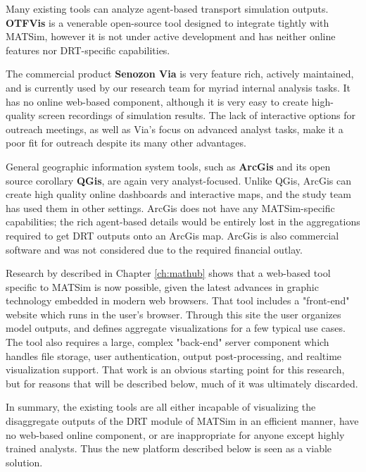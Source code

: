 Many existing tools can analyze agent-based transport simulation outputs. \textbf{OTFVis} \cite{Srippgen2015OTFVisInBook} is a venerable open-source tool designed to integrate tightly with MATSim, however it is not under active development and has neither online features nor DRT-specific capabilities.

The commercial product \textbf{Senozon Via} \cite{Rieser2015SenozonViaInBook} is very feature rich, actively maintained, and is currently used by our research team for myriad internal analysis tasks. It has no online web-based component, although it is very easy to create high-quality screen recordings of simulation results. The lack of interactive options for outreach meetings, as well as Via's focus on advanced analyst tasks, make it a poor fit for outreach despite its many other advantages.

General geographic information system tools, such as \textbf{ArcGis} and its open source corollary \textbf{QGis}, are again very analyst-focused. Unlike QGis, ArcGis can create high quality online dashboards and interactive maps, and the study team has used them in other settings. ArcGis does not have any MATSim-specific capabilities; the rich agent-based details would be entirely lost in the aggregations required to get DRT outputs onto an ArcGis map. ArcGis is also commercial software and was not considered due to the required financial outlay.

Research by \citet{CharltonLaudan2020WebBasedVisualization} described in Chapter \ref{ch:mathub} shows that a web-based tool specific to MATSim is now possible, given the latest advances in graphic technology embedded in modern web browsers. That tool includes a "front-end" website which runs in the user's browser. Through this site the user organizes model outputs, and defines aggregate visualizations for a few typical use cases. The tool also requires a large, complex "back-end" server component which handles file storage, user authentication, output post-processing, and realtime visualization support. That work is an obvious starting point for this research, but for reasons that will be described below, much of it was ultimately discarded.

In summary, the existing tools are all either incapable of visualizing the disaggregate outputs of the DRT module of MATSim in an efficient manner, have no web-based online component, or are inappropriate for anyone except highly trained analysts. Thus the new platform described below is seen as a viable solution.

